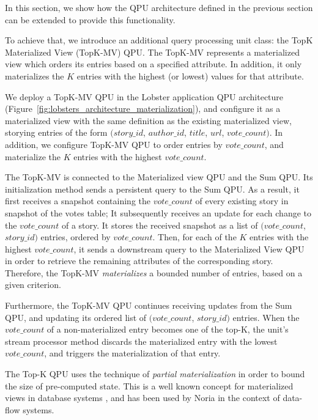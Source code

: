 In this section, we show how the QPU architecture defined in the previous section can be extended to provide this
functionality.

To achieve that, we introduce an additional query processing unit class: the TopK Materialized View (TopK-MV) QPU.
The TopK-MV represents a materialized view which orders its entries based on a specified attribute.
In addition, it only materializes the $K$ entries with the highest (or lowest) values for that attribute.

We deploy a TopK-MV QPU in the Lobster application QPU architecture (Figure~\ref{fig:lobsters_architecture_materialization}),
and configure it as a materialized view with the same definition as the existing materialized view,
storying entries of the form $(story\_id$, $author\_id$, $title$, $url$, $vote\_count)$.
In addition, we configure TopK-MV QPU to order entries by $vote\_count$, and materialize the $K$ entries with the highest $vote\_count$.

The TopK-MV is connected to the Materialized view QPU and the Sum QPU.
Its initialization method sends a persistent query to the Sum QPU.
As a result, it first receives a snapshot containing the $vote\_count$ of every existing story in snapshot of the votes table;
It subsequently receives an update for each change to the $vote\_count$ of a story.
It stores the received snapshot as a list of $(vote\_count$, $story\_id)$ entries, ordered by $vote\_count$.
Then, for each of the $K$ entries with the highest $vote\_count$,
it sends a downstream query to the Materialized View QPU in order to retrieve the remaining attributes of the corresponding story.
Therefore, the TopK-MV \textit{materializes} a bounded number of entries, based on a given criterion.

Furthermore, the TopK-MV QPU continues receiving updates from the Sum QPU, and updating its
ordered list of $(vote\_count$, $story\_id)$ entries.
When the $vote\_count$ of a non-materialized entry becomes one of the top-K,
the unit's stream processor method discards the materialized entry with the lowest $vote\_count$,
and triggers the materialization of that entry.

The Top-K QPU uses the technique of \textit{partial materialization} in order to bound the size of pre-computed state.
This is a well known concept for materialized views in database systems \cite{zhou:partiallymaterialized, zhou:dynamicmaterialized},
and has been used by Noria \cite{gjengset:noria} in the context of data-flow systems.

